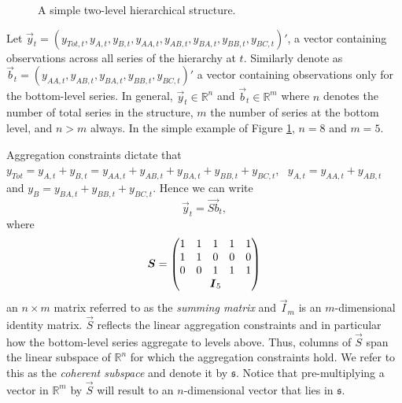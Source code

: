 \documentclass[graybox]{svmult}
\begin{document}
\begin{figure}[!hbt]  \center
  \caption{A simple two-level hierarchical structure.}
  \label{fig:simple tree}
\end{figure}

Let $\vec{y}_t = (y_{Tot,t},y_{A,t}, y_{B,t},y_{AA,t}, y_{AB,t}, y_{BA,t}, y_{BB,t},y_{BC,t})'$, a vector containing observations across all series of the hierarchy at $t$. Similarly denote as $\vec{b}_t = (y_{AA,t}, y_{AB,t}, y_{BA,t}, y_{BB,t}, y_{BC,t})'$ a vector containing observations only for the bottom-level series. In general, $\vec{y}_t\in \mathbb{R}^n$ and $\vec{b}_t \in \mathbb{R}^m$ where $n$ denotes the number of total series in the structure, $m$ the number of series at the bottom level, and $n>m$ always. In the simple example of Figure \ref{fig:simple tree}, $n=8$ and $m=5$.

Aggregation constraints dictate that $y_{Tot}=y_{A,t}+y_{B,t}=y_{AA,t}+y_{AB,t}+y_{BA,t}+y_{BB,t}+y_{BC,t}$,~ $y_{A,t}=y_{AA,t}+y_{AB,t}$ and $y_{B}=y_{BA,t}+y_{BB,t}+y_{BC,t}$. Hence we can write
\begin{equation}\label{eq:summing matrix}
\vec{y}_t = \vec{Sb}_t,
\end{equation}
where \begin{equation*}
\vec{S} = \begin{pmatrix}
1& 1& 1& 1 & 1 \\
1& 1& 0& 0 & 0\\
0& 0& 1& 1 & 1\\
& \multicolumn{3}{c}{\vec{I}_5} &
\end{pmatrix}
\end{equation*}
an $n\times m$ matrix referred to as the \textit{summing matrix} and $\vec{I}_m$ is an $m$-dimensional identity matrix. $\vec{S}$ reflects the linear aggregation constraints and in particular how the bottom-level series aggregate to levels above. Thus, columns of $\vec{S}$ span the linear subspace of $\mathbb{R}^n$ for which the aggregation constraints hold. We refer to this as the \textit{coherent subspace} and denote it by $\mathfrak{s}$. Notice that pre-multiplying a vector in $\mathbb{R}^m$ by $\vec{S}$ will result to an $n$-dimensional vector that lies in $\mathfrak{s}$.
\end{document}
